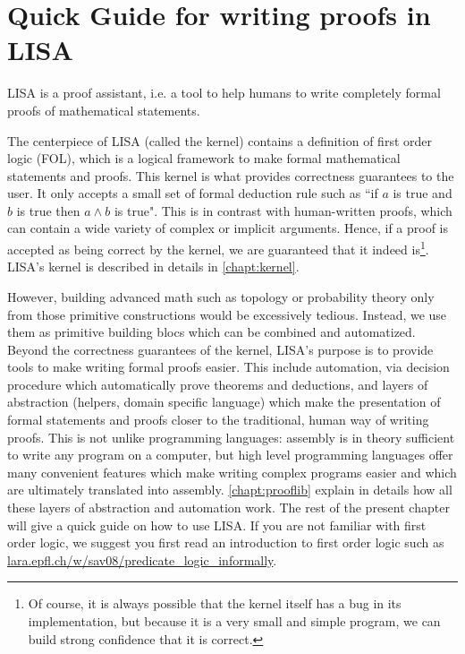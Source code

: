 \chapter{Quick Guide for writing proofs in LISA}
\label{chapt:quickguide}
LISA is a proof assistant, i.e. a tool to help humans to write completely formal proofs of mathematical statements. 

The centerpiece of LISA (called the kernel) contains a definition of first order logic (FOL), which is a logical framework to make formal mathematical statements and proofs. This kernel is what provides correctness guarantees to the user. It only accepts a small set of formal deduction rule such as ``if $a$ is true and $b$ is true then $a\land b$ is true". 
This is in contrast with human-written proofs, which can contain a wide variety of complex or implicit arguments. Hence, if a proof is accepted as being correct by the kernel, we are guaranteed that it indeed is\footnote{Of course, it is always possible that the kernel itself has a bug in its implementation, but because it is a very small and simple program, we can build strong confidence that it is correct.}.
LISA's kernel is described in details in \autoref{chapt:kernel}.

However, building advanced math such as topology or probability theory only from those primitive constructions would be excessively tedious. Instead, we use them as primitive building blocs which can be combined and automatized. Beyond the correctness guarantees of the kernel, LISA's purpose is to provide tools to make writing formal proofs easier. This include automation, via decision procedure which automatically prove theorems and deductions, and layers of abstraction (helpers, domain specific language) which make the presentation of formal statements and proofs closer to the traditional, human way of writing proofs. 
This is not unlike programming languages: assembly is in theory sufficient to write any program on a computer, but high level programming languages offer many convenient features which make writing complex programs easier and which are ultimately translated into assembly. 
\autoref{chapt:prooflib} explain in details how all these layers of abstraction and automation work. The rest of the present chapter will give a quick guide on how to use LISA. If you are not familiar with first order logic, we suggest you first read an introduction to first order logic such as \url{lara.epfl.ch/w/sav08/predicate_logic_informally}.

